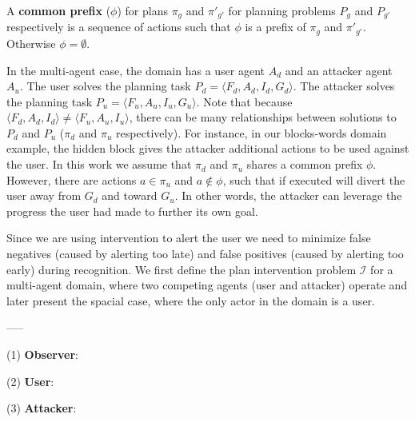 A \textbf{common prefix} ($\phi$) for plans $\pi_g$ and $\pi\prime_{g\prime}$ for planning problems $P_g$ and $P_{g\prime}$ respectively is a sequence of actions such that $\phi$ is a prefix of $\pi_g$ and $\pi\prime_{g\prime}$. Otherwise $\phi=\emptyset$.

In the multi-agent case, the domain has a user agent $A_d$ and an attacker agent $A_u$. The user solves the planning task $ P_d = \langle F_d, A_d, I_d, G_d \rangle$. The attacker solves the planning task $ P_u = \langle F_u, A_u, I_u, G_u \rangle$. Note that because $\langle F_d, A_d, I_d\rangle \neq \langle F_u, A_u, I_u\rangle$, there can be many relationships between solutions to $P_d$ and $P_u$ ($\pi_d$ and $\pi_u$ respectively). For instance, in our blocks-words domain example, the hidden block gives the attacker additional actions to be used against the user. In this work we assume that $\pi_d$ and $\pi_u$ shares a common prefix $\phi$. However, there are actions $a\in\pi_u$ and $a \notin \phi$, such that if executed will divert the user away from $G_d$ and toward $G_u$. In other words, the attacker can leverage the progress the user had made to further its own goal.



Since we are using intervention to alert the user we need to minimize false negatives (caused by alerting too late) and false positives (caused by alerting too early) during recognition. We first define the plan intervention problem $\mathcal{I}$ for a multi-agent domain, where two competing agents (user and attacker) operate and later present the spacial case, where the only actor in the domain is a user.

-----

(1) \textbf{Observer}: 


(2) \textbf{User}: 

(3) \textbf{Attacker}: 

